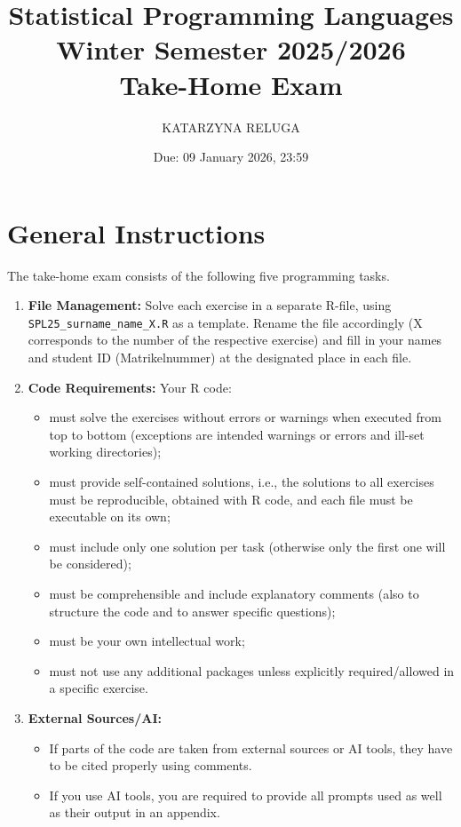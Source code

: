 \documentclass[a4paper,11pt]{article}
\title{\textbf{Statistical Programming Languages Winter Semester 2025/2026 \\ Take-Home Exam}}
\author{KATARZYNA RELUGA}
\date{Due: 09 January 2026, 23:59}
\begin{document}
\maketitle

\section*{General Instructions}

The take-home exam consists of the following five programming tasks.

\begin{enumerate}
    \item \textbf{File Management:} Solve each exercise in a separate R-file, using \texttt{SPL25\_surname\_name\_X.R} as a template. Rename the file accordingly (X corresponds to the number of the respective exercise) and fill in your names and student ID (Matrikelnummer) at the designated place in each file.
    \item \textbf{Code Requirements:} Your R code:
    \begin{itemize}
        \item must solve the exercises without errors or warnings when executed from top to bottom (exceptions are intended warnings or errors and ill-set working directories);
        \item must provide self-contained solutions, i.e., the solutions to all exercises must be reproducible, obtained with R code, and each file must be executable on its own;
        \item must include only one solution per task (otherwise only the first one will be considered);
        \item must be comprehensible and include explanatory comments (also to structure the code and to answer specific questions);
        \item must be your own intellectual work;
        \item must not use any additional packages unless explicitly required/allowed in a specific exercise.
    \end{itemize}
    \item \textbf{External Sources/AI:}
    \begin{itemize}
        \item If parts of the code are taken from external sources or AI tools, they have to be cited properly using comments.
        \item If you use AI tools, you are required to provide all prompts used as well as their output in an appendix.

\end{itemize}
\end{enumerate}
\end{document}
